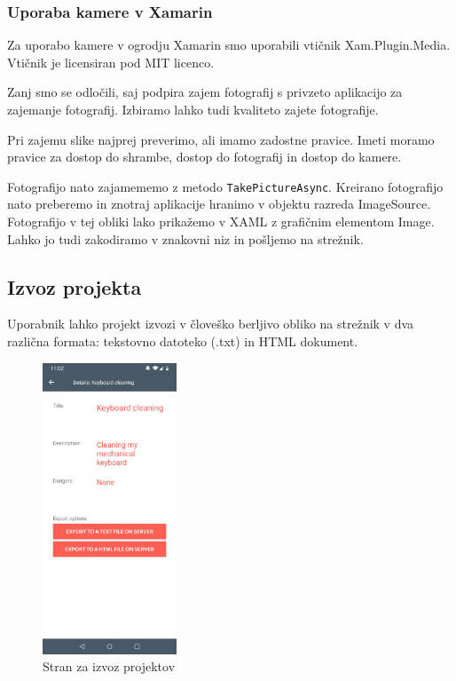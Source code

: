 \documentclass[a4paper, 12pt]{book}
\begin{document}
\subsubsection{Uporaba kamere v Xamarin}


Za uporabo kamere v ogrodju Xamarin smo uporabili vtičnik Xam.Plugin.Media.
Vtičnik je licensiran pod MIT licenco.

Zanj smo se odločili, saj podpira zajem fotografij s privzeto aplikacijo za zajemanje fotografij.
Izbiramo lahko tudi kvaliteto zajete fotografije.

Pri zajemu slike najprej preverimo, ali imamo zadostne pravice.
Imeti moramo pravice za dostop do shrambe, dostop do fotografij in dostop do kamere.

Fotografijo nato zajamememo z metodo \texttt{TakePictureAsync}.
Kreirano fotografijo nato preberemo in znotraj aplikacije hranimo v objektu razreda ImageSource.
Fotografijo v tej obliki lako prikažemo v XAML z grafičnim elementom Image.
Lahko jo tudi zakodiramo v znakovni niz in pošljemo na strežnik.


\subsection{Izvoz projekta}

Uporabnik lahko projekt izvozi v človeško berljivo obliko na strežnik v dva različna formata: tekstovno datoteko (.txt) in HTML dokument.

\begin{figure}[H]
\begin{center}
	\includegraphics[width=4cm]{app_project_export}
\end{center}
	\caption{Stran za izvoz projektov}
\label{app_note}
\end{figure}
\end{document}

